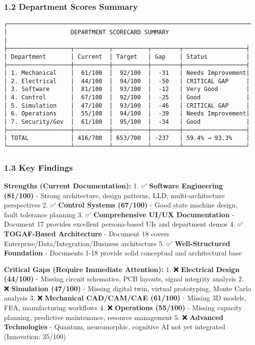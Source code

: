 \documentclass[
]{article}
\begin{document}
\hypertarget{department-scores-summary}{%
\subsubsection{1.2 Department Scores
Summary}\label{department-scores-summary}}

\begin{verbatim}
┌─────────────────────────────────────────────────────────────────────┐
│                  DEPARTMENT SCORECARD SUMMARY                       │
├──────────────────┬──────────┬──────────┬────────┬──────────────────┤
│ Department       │ Current  │ Target   │ Gap    │ Status           │
├──────────────────┼──────────┼──────────┼────────┼──────────────────┤
│ 1. Mechanical    │  61/100  │  92/100  │  -31   │ Needs Improvement│
│ 2. Electrical    │  44/100  │  94/100  │  -50   │ CRITICAL GAP     │
│ 3. Software      │  81/100  │  93/100  │  -12   │ Very Good        │
│ 4. Control       │  67/100  │  92/100  │  -25   │ Good             │
│ 5. Simulation    │  47/100  │  93/100  │  -46   │ CRITICAL GAP     │
│ 6. Operations    │  55/100  │  94/100  │  -39   │ Needs Improvement│
│ 7. Security/Gov  │  61/100  │  95/100  │  -34   │ Good             │
├──────────────────┼──────────┼──────────┼────────┼──────────────────┤
│ TOTAL            │ 416/700  │ 653/700  │ -237   │ 59.4% → 93.3%    │
└──────────────────┴──────────┴──────────┴────────┴──────────────────┘
\end{verbatim}

\hypertarget{key-findings}{%
\subsubsection{1.3 Key Findings}\label{key-findings}}

\textbf{Strengths (Current Documentation):} 1. ✅ \textbf{Software
Engineering (81/100)} - Strong architecture, design patterns, LLD,
multi-architecture perspectives 2. ✅ \textbf{Control Systems (67/100)}
- Good state machine design, fault tolerance planning 3. ✅
\textbf{Comprehensive UI/UX Documentation} - Document 17 provides
excellent persona-based UIs and department demos 4. ✅
\textbf{TOGAF-Based Architecture} - Document 18 covers
Enterprise/Data/Integration/Business architecture 5. ✅
\textbf{Well-Structured Foundation} - Documents 1-18 provide solid
conceptual and architectural base

\textbf{Critical Gaps (Require Immediate Attention):} 1. ❌
\textbf{Electrical Design (44/100)} - Missing circuit schematics, PCB
layouts, signal integrity analysis 2. ❌ \textbf{Simulation (47/100)} -
Missing digital twin, virtual prototyping, Monte Carlo analysis 3. ❌
\textbf{Mechanical CAD/CAM/CAE (61/100)} - Missing 3D models, FEA,
manufacturing workflows 4. ❌ \textbf{Operations (55/100)} - Missing
capacity planning, predictive maintenance, resource management 5. ❌
\textbf{Advanced Technologies} - Quantum, neuromorphic, cognitive AI not
yet integrated (Innovation: 35/100)
\end{document}
